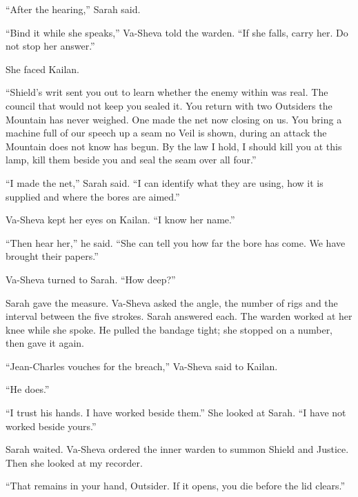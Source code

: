 ``After the hearing,'' Sarah said.\par

``Bind it while she speaks,'' Va-Sheva told the warden. ``If she falls, carry her. Do not stop her answer.''\par

She faced Kailan.\par

``Shield's writ sent you out to learn whether the enemy within was real. The council that would not keep you sealed it. You return with two Outsiders the Mountain has never weighed. One made the net now closing on us. You bring a machine full of our speech up a seam no Veil is shown, during an attack the Mountain does not know has begun. By the law I hold, I should kill you at this lamp, kill them beside you and seal the seam over all four.''\par

``I made the net,'' Sarah said. ``I can identify what they are using, how it is supplied and where the bores are aimed.''\par

Va-Sheva kept her eyes on Kailan. ``I know her name.''\par

``Then hear her,'' he said. ``She can tell you how far the bore has come. We have brought their papers.''\par

Va-Sheva turned to Sarah. ``How deep?''\par

Sarah gave the measure. Va-Sheva asked the angle, the number of rigs and the interval between the five strokes. Sarah answered each. The warden worked at her knee while she spoke. He pulled the bandage tight; she stopped on a number, then gave it again.\par

``Jean-Charles vouches for the breach,'' Va-Sheva said to Kailan.\par

``He does.''\par

``I trust his hands. I have worked beside them.'' She looked at Sarah. ``I have not worked beside yours.''\par

Sarah waited. Va-Sheva ordered the inner warden to summon Shield and Justice. Then she looked at my recorder.\par

``That remains in your hand, Outsider. If it opens, you die before the lid clears.''\par

